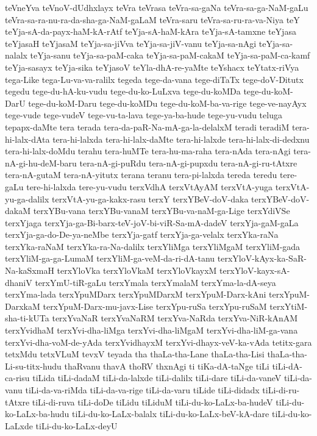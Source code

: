 {teVneYva
teVnoV-dUdhxlayx
teVra
teVrasa
teVra-sa-gaNa
teVra-sa-ga-NaM-gaLu
teVra-sa-ra-nu-ra-da-sha-ga-NaM-gaLaM
teVra-saru
teVra-sa-ru-ra-va-Niya
teY
teYja-sA-da-payx-haM-kA-rAtf
teYja-sA-haM-kAra
teYja-sA-tamxne
teYjasa
teYjasaH
teYjasaM
teYja-sa-jiVva
teYja-sa-jiV-vanu
teYja-sa-nAgi
teYja-sa-nalalx
teYja-sanu
teYja-sa-paM-caka
teYja-sa-paM-cakaM
teYja-sa-paM-ca-kamf
teYja-sasayx
teYja-sika
teYjasoV
teYla-dhA-re-yaMte
teYshacx
teYtatx-riVya
tega-Like
tega-Lu-va-va-ralilx
tegeda
tege-da-vana
tege-diTaTx
tege-doV-Ditutx
tegedu
tege-du-hA-ku-vudu
tege-du-ko-LuLxva
tege-du-koMDa
tege-du-koM-DarU
tege-du-koM-Daru
tege-du-koMDu
tege-du-koM-ba-va-rige
tege-ve-nayAyx
tege-vude
tege-vudeV
tege-vu-ta-lava
tege-ya-ba-hude
tege-yu-vudu
teluga
tepapx-daMte
tera
terada
tera-da-paR-Na-mA-ga-la-delalxM
teradi
teradiM
tera-hi-lalx-dAta
tera-hi-lalxda
tera-hi-lalx-daMte
tera-hi-lalxde
tera-hi-lalx-di-dedxnu
tera-hi-lalx-doMdu
terahu
tera-huMTe
tera-hu-ma-raha
tera-nAda
tera-nAgi
tera-nA-gi-hu-deM-baru
tera-nA-gi-puRdu
tera-nA-gi-pupxdu
tera-nA-gi-ru-tAtxre
tera-nA-gutaM
tera-nA-yitutx
terana
teranu
tera-pi-lalxda
tereda
teredu
tere-gaLu
tere-hi-lalxda
tere-yu-vudu
terxVdhA
terxVtAyAM
terxVtA-yuga
terxVtA-yu-ga-dalilx
terxVtA-yu-ga-kakx-rasu
terxY
terxYBeV-doV-daka
terxYBeV-doV-dakaM
terxYBu-vana
terxYBu-vanaM
terxYBu-va-naM-ga-Lige
terxYdiVSe
terxYjaga
terxYja-ga-Bi-barx-teV-joV-bi-viR-Sa-mA-dadeV
terxYja-gaM-gaLa
terxYja-ga-do-De-ya-neMbe
terxYja-gatf
terxYja-ga-velalx
terxYka-raNa
terxYka-raNaM
terxYka-ra-Na-dalilx
terxYliMga
terxYliMgaM
terxYliM-gada
terxYliM-ga-ga-LumaM
terxYliM-ga-veM-da-ri-dA-tanu
terxYloV-kAyx-ka-SaR-Na-kaSxmaH
terxYloVka
terxYloVkaM
terxYloVkayxM
terxYloV-kayx-sA-dhaniV
terxYmU-tiR-gaLu
terxYmala
terxYmalaM
terxYma-la-dA-seya
terxYma-lada
terxYpuMDarx
terxYpuMDarxM
terxYpuM-Darx-kAni
terxYpuM-DarxkaM
terxYpuM-Darx-mu-javx-Lise
terxYpu-ruSa
terxYpu-ruSaM
terxYtiM-sha-ti-kUTa
terxYvaNaR
terxYvaNaRM
terxYva-NaRda
terxYva-NiR-kAnAM
terxYvidhaM
terxYvi-dha-liMga
terxYvi-dha-liMgaM
terxYvi-dha-liM-ga-vana
terxYvi-dha-voM-de-yAda
terxYvidhayxM
terxYvi-dhayx-veV-ka-vAda
tetitx-gara
tetxMdu
tetxVLuM
tevxV
teyada
tha
thaLa-tha-Lane
thaLa-tha-Lisi
thaLa-tha-Li-su-titx-hudu
thaRvanu
thavA
thoRV
thxnAgi
ti
tiKa-dA-taNge
tiLi
tiLi-dA-ca-risu
tiLida
tiLi-dadaM
tiLi-da-lalxde
tiLi-dalilx
tiLi-dare
tiLi-da-vaneV
tiLi-da-vanu
tiLi-da-va-riMda
tiLi-da-va-rige
tiLi-da-varu
tiLide
tiLi-didadx
tiLi-di-ru-tAtxre
tiLi-di-ruva
tiLi-doDe
tiLidu
tiLiduM
tiLi-du-ko-LaLx-ba-hudeV
tiLi-du-ko-LaLx-ba-hudu
tiLi-du-ko-LaLx-balalx
tiLi-du-ko-LaLx-beV-kA-dare
tiLi-du-ko-LaLxde
tiLi-du-ko-LaLx-deyU
}
